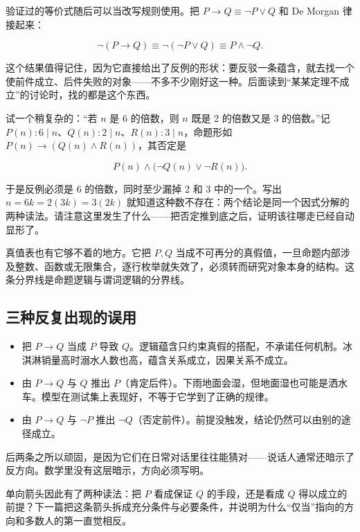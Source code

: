 验证过的等价式随后可以当改写规则使用。把 \(P\to Q\equiv\neg P\lor Q\) 和 De Morgan 律接起来：

\[
\neg(P\to Q)\equiv\neg(\neg P\lor Q)\equiv P\land\neg Q.
\]

这个结果值得记住，因为它直接给出了反例的形状：要反驳一条蕴含，就去找一个使前件成立、后件失败的对象——不多不少刚好这一种。后面读到``某某定理不成立''的讨论时，找的都是这个东西。

试一个稍复杂的：``若 \(n\) 是 6 的倍数，则 \(n\) 既是 2 的倍数又是 3 的倍数。''记 \(P(n):6\mid n\)、\(Q(n):2\mid n\)、\(R(n):3\mid n\)，命题形如 \(P(n)\to(Q(n)\land R(n))\)，其否定是

\[
P(n)\land\bigl(\neg Q(n)\lor\neg R(n)\bigr).
\]

于是反例必须是 6 的倍数，同时至少漏掉 2 和 3 中的一个。写出 \(n=6k=2(3k)=3(2k)\) 就知道这种数不存在：两个结论是同一个因式分解的两种读法。请注意这里发生了什么——把否定推到底之后，证明该往哪走已经自动显形了。

真值表也有它够不着的地方。它把 \(P,Q\) 当成不可再分的真假值，一旦命题内部涉及整数、函数或无限集合，逐行枚举就失效了，必须转而研究对象本身的结构。这条分界线是命题逻辑与谓词逻辑的分界线。

\subsection{三种反复出现的误用}

\begin{itemize}
\tightlist
\item
  把 \(P\to Q\) 当成 \(P\) 导致 \(Q\)。逻辑蕴含只约束真假的搭配，不承诺任何机制。冰淇淋销量高时溺水人数也高，蕴含关系成立，因果关系不成立。
\item
  由 \(P\to Q\) 与 \(Q\) 推出 \(P\)（肯定后件）。下雨地面会湿，但地面湿也可能是洒水车。模型在测试集上表现好，不等于它学到了正确的规律。
\item
  由 \(P\to Q\) 与 \(\neg P\) 推出 \(\neg Q\)（否定前件）。前提没触发，结论仍然可以由别的途径成立。
\end{itemize}

后两条之所以顽固，是因为它们在日常对话里往往能猜对——说话人通常还暗示了反方向。数学里没有这层暗示，方向必须写明。

单向箭头因此有了两种读法：把 \(P\) 看成保证 \(Q\) 的手段，还是看成 \(Q\) 得以成立的前提？下一篇把这条箭头拆成充分条件与必要条件，并说明为什么``仅当''指向的方向和多数人的第一直觉相反。
